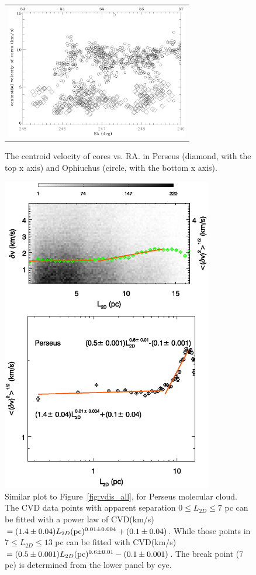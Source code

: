 \documentclass[iop,revtex4]{emulateapj}
\begin{document}
\begin{figure}[htbp]
\centering
\begin{tabular}{c}
\includegraphics[width=8cm]{pera_oph_velocityra.eps}
\end{tabular}
\caption{The centroid velocity of cores vs. RA. in Perseus (diamond, with the top x axis) and Ophiuchus (circle, with the bottom x axis).\label{fig:perseus_core_gradient}}
\end{figure}



\begin{figure}[htbp]
\begin{minipage}[b]{0.45\textwidth}
  \includegraphics[width=9.2cm]{pera_vdis_all_all.eps}
\end{minipage}
\caption{Similar plot to Figure~\ref{fig:vdis_all}, for Perseus molecular cloud. The CVD data points with apparent separation $0\leq L_{2D} \leq 7$  pc can be fitted with a power law of CVD(km/s)$=(1.4\pm 0.04)L_{2D} ({\rm pc})^{0.01\pm 0.004}+(0.1\pm 0.04)$. While those points in $7\leq L_{2D} \leq 13$  pc can be fitted with CVD(km/s)$=(0.5\pm 0.001)L_{2D} ({\rm pc})^{0.6\pm 0.01}-(0.1\pm 0.001)$. The break point (7 pc) is determined from the lower panel by eye.}\label{fig:pera_vdis_all}
\end{figure}
\end{document}
